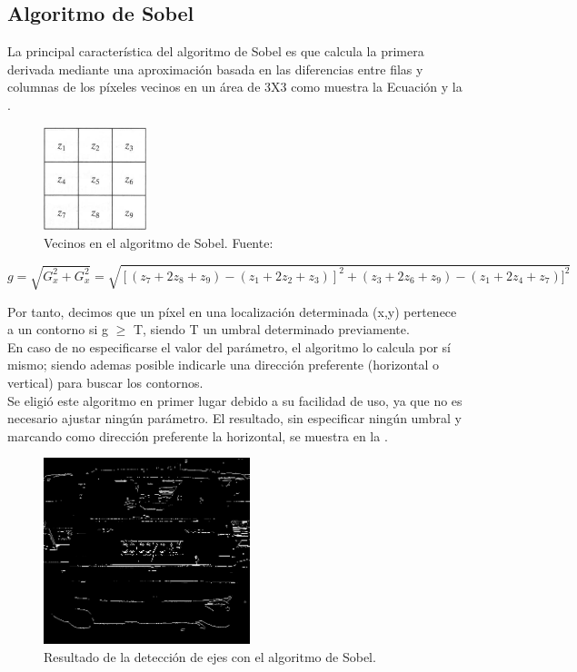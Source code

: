 \subsection{Algoritmo de Sobel}
La principal característica del algoritmo de Sobel es que calcula la primera derivada  mediante una aproximación basada en las diferencias entre filas y columnas de los píxeles vecinos en un área de 3X3 como muestra la Ecuación  y la  .

\begin{figure}[!h]
\centering
\includegraphics[width=3cm]{VecinosSovel.png}
\caption{\small{Vecinos en el algoritmo de Sobel. Fuente:}\cite{ImgProcessMat}}
\label{VecinosSobel}
\end{figure}

\begin{equation}
g= \sqrt{G_{x}^{2}+G_{x}^{2}}
= \sqrt{[(z_{7} + 2z_{8} + z_{9})-(z_{1} + 2z_{2} + z_{3})]^{2} + (z_{3} + 2z_{6} + z_{9})-(z_{1} + 2z_{4} + z_{7})]^{2} }
\label{ecuacion1}
\end{equation}

Por tanto, decimos que un píxel en una localización determinada (x,y) pertenece a un contorno si g $\geq$ T, siendo T un umbral determinado previamente. \\

En caso de no especificarse el valor del parámetro, el algoritmo lo calcula por sí mismo; siendo ademas posible indicarle una dirección preferente (horizontal o vertical) para buscar los contornos.\\

Se eligió este algoritmo en primer lugar debido a su facilidad de uso, ya que no es necesario ajustar ningún parámetro. El resultado, sin especificar ningún umbral y marcando como dirección preferente la horizontal, se muestra en la .

\begin{figure}[!h]
\centering
\includegraphics[width=6cm]{EjemploSobel.png}
\caption{\small{Resultado de la detección de ejes con el algoritmo de Sobel.}}
\label{EjemploSobel}
\end{figure}

